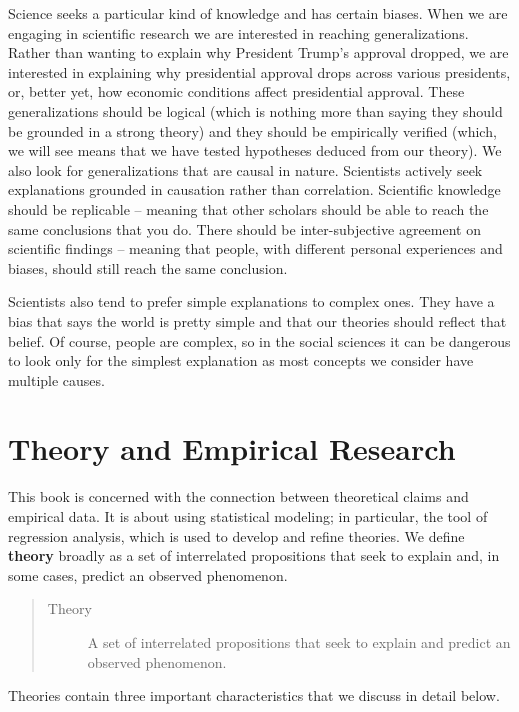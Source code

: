 \documentclass[11pt,openany]{book}\usepackage[]{graphicx}\usepackage[]{color}
\begin{document}
Science seeks a particular kind of knowledge and has certain biases. When we are engaging in scientific research  we are interested in reaching generalizations. Rather than wanting to explain why President Trump's approval dropped,  we are interested in explaining why presidential approval drops across various presidents, or, better yet, how economic  conditions affect presidential approval. These generalizations should be logical (which is nothing more than saying they  should be grounded in a strong theory) and they should be empirically verified (which, we will see means that we have  tested hypotheses deduced from our theory). We also look for generalizations that are causal in nature. Scientists actively seek explanations grounded in causation rather than correlation. Scientific knowledge should be replicable -- meaning that other scholars should be able to reach the same conclusions that you do. There should be inter-subjective agreement on scientific findings -- meaning that people, with different personal experiences and biases, should still reach the same conclusion.

Scientists also tend to prefer simple explanations to complex ones. They have a bias that says the world is pretty simple and that our theories should reflect that belief. Of course, people are complex, so in the social sciences it can be dangerous to look only for the simplest explanation as most concepts we consider have multiple causes.

\section{Theory and Empirical Research}

This book is concerned with the connection between theoretical claims and empirical data. It is about using statistical modeling; in particular, the tool of regression analysis, which is used to develop and refine theories. We define \textbf{theory} broadly as a set of interrelated propositions that seek to explain and, in some cases, predict an observed phenomenon. 
\begin{quote}
\begin{description}
\item[Theory] A set of interrelated propositions that seek to 
  explain and predict an observed phenomenon.
\end{description}
\end{quote}

\noindent Theories contain three important characteristics that we discuss in detail below. 
\end{document}
